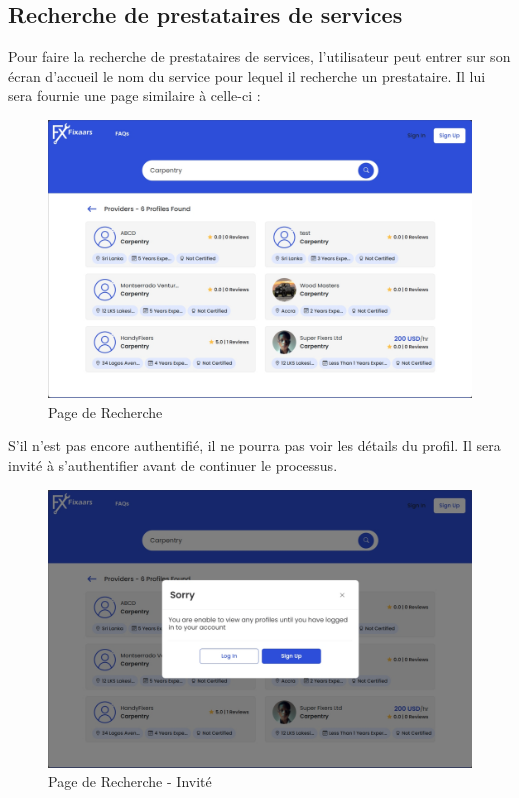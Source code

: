 \subsection{Recherche de prestataires de services}

Pour faire la recherche de prestataires de services, l'utilisateur peut entrer sur son écran d'accueil le nom du service pour lequel il recherche un prestataire. Il lui sera fournie une page similaire à celle-ci  :

\vspace{0.35cm}
\begin{figure}[H]
\begin{center}
\includegraphics[width=12cm]{assets/demo/search-1.png}
\end{center}
\caption{Page de Recherche}
\end{figure}

S'il n'est pas encore authentifié, il ne pourra pas voir les détails du profil. Il sera invité à s'authentifier avant de continuer le processus.

\vspace{0.35cm}
\begin{figure}[H]
\begin{center}
\includegraphics[width=12cm]{assets/demo/search-2.png}
\end{center}
\caption{Page de Recherche - Invité}
\end{figure}

